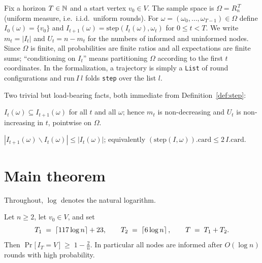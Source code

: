 \begin{definition}[Process]\label{def:process}
  \leanok
  Fix a horizon $T \in \mathbb{N}$ and a start vertex $v_0 \in V$. The sample space
  is $\Omega = R_n^{\,T}$ (uniform measure, i.e.\ i.i.d.\ uniform rounds).
  For $\omega = (\omega_0,\dots,\omega_{T-1}) \in \Omega$ define
  $I_0(\omega) = \{v_0\}$ and
  $I_{t+1}(\omega) = \mathrm{step}(I_t(\omega), \omega_t)$ for $0 \le t < T$.
  We write $m_t = |I_t|$ and $U_t = n - m_t$ for the numbers of informed and
  uninformed nodes. Since $\Omega$ is finite, all probabilities are finite
  ratios and all expectations are finite sums; ``conditioning on $I_t$''
  means partitioning $\Omega$ according to the first $t$ coordinates. In the
  formalization, a trajectory is simply a \texttt{List} of round
  configurations and $\mathrm{run}\ I\ l$ folds \texttt{step} over the list
  $l$.
\end{definition}

Two trivial but load-bearing facts, both immediate from
Definition~\ref{def:step}:

\begin{lemma}[Monotonicity]\label{lem:mono}
  \leanok
  $I_t(\omega) \subseteq I_{t+1}(\omega)$ for all $t$ and all $\omega$;
  hence $m_t$ is non-decreasing and $U_t$ is non-increasing in $t$,
  pointwise on $\Omega$.
\end{lemma}

\begin{lemma}\label{lem:atmost}
  \leanok
  $|I_{t+1}(\omega) \smallsetminus I_t(\omega)| \le |I_t(\omega)|$; equivalently
  $(\mathrm{step}(I,\omega)).\mathrm{card} \le 2\,I.\mathrm{card}$.
\end{lemma}

\section{Main theorem}\label{sec:main-statement}

Throughout, $\log$ denotes the natural logarithm.

\begin{theorem}
  \label{thm:main}
  \leanok
  Let $n \ge 2$, let $v_0 \in V$, and set
  \[
    T_1 \;=\; \left\lceil 117 \log n \right\rceil + 23, \qquad
    T_2 \;=\; \left\lceil 6 \log n \right\rceil, \qquad
    T \;=\; T_1 + T_2 .
  \]
  Then $\Pr\bigl[\, I_T = V \,\bigr] \;\ge\; 1 - \frac{2}{n}$.
  In particular all nodes are informed after $O(\log n)$ rounds with high
  probability.
\end{theorem}

